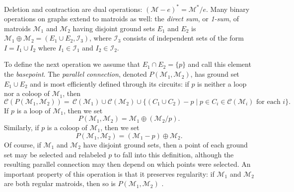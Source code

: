 \documentclass{amsart}
\numberwithin{equation}{section}
\theoremstyle{plain}
\newtheorem{prop}[thm]{Proposition}
\theoremstyle{definition}
\newcommand{\calC}{\mathcal{C}}
\newcommand{\calI}{\mathcal{I}}
\newcommand{\calM}{\mathcal{M}}
\begin{document}
Deletion and contraction are dual operations: $(\calM - e)^* = \calM^*/e$.
Many binary operations on graphs extend to matroids as well:
the \emph{direct sum}, or \emph{1-sum}, of matroids $\calM_1$ and $\calM_2$ having disjoint ground sets $E_1$ and $E_2$ is $\calM_1 \oplus \calM_2 = (E_1 \cup E_2, \calI_3)$, where $\calI_3$ consists of independent sets of the form $I = I_1 \cup I_2$ where $I_1 \in \calI_1$ and $I_2 \in \calI_2$.

To define the next operation we assume that $E_1 \cap E_2 = \{p\}$ and call this element the \emph{basepoint}.
The \emph{parallel connection}, denoted $P(\calM_1,\calM_2)$, has ground set $E_1 \cup E_2$ and is most efficiently defined through its circuits: if $p$ is neither a loop nor a coloop of $\calM_1$, then
\[
    \calC(P(\calM_1,\calM_2)) = \, \calC(\calM_1) \cup \calC(\calM_2) \cup \{(C_1 \cup C_2) - p \mid p \in C_i \in \calC(\calM_i) \text{ for each } i\}.
\]
If $p$ is a loop of $\calM_1$, then we set
\[
P(\calM_1, \calM_2) = \calM_1 \oplus (\calM_2 / p). %
\]
Similarly, if $p$ is a coloop of $\calM_1$, then we set
\[
P(\calM_1, \calM_2) = (\calM_1-p) \oplus \calM_2. %
\]
Of course, if $\calM_1$ and $\calM_2$ have disjoint ground sets, then a point of each ground set may be selected and relabeled $p$ to fall into this definition, although the resulting parallel connection may then depend on which points were selected.
An important property of this operation is that it preserves regularity: if $\calM_1$ and $\calM_2$ are both regular matroids, then so is $P(\calM_1,\calM_2)$ \cite[Corollary 7.1.25]{Oxley}.

\end{document}

